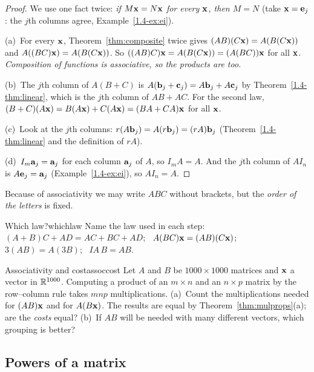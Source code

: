 \documentclass[11pt]{article}
\begin{document}
\begin{proof}
We use one fact twice: \emph{if $M\mathbf{x}=N\mathbf{x}$ for every $\mathbf{x}$, then $M=N$} (take $\mathbf{x}=\mathbf{e}_j$: the $j$th columns agree, Example~\ref{1.4-ex:ei}).

(a)~For every $\mathbf{x}$, Theorem~\ref{thm:composite} twice gives $(AB)(C\mathbf{x})=A(B(C\mathbf{x}))$ and $A((BC)\mathbf{x})=A(B(C\mathbf{x}))$. So $((AB)C)\mathbf{x}=A(B(C\mathbf{x}))=(A(BC))\mathbf{x}$ for all $\mathbf{x}$. \emph{Composition of functions is associative, so the products are too.}

(b)~The $j$th column of $A(B+C)$ is $A(\mathbf{b}_j+\mathbf{c}_j)=A\mathbf{b}_j+A\mathbf{c}_j$ by Theorem~\ref{1.4-thm:linear}, which is the $j$th column of $AB+AC$. For the second law, $(B+C)(A\mathbf{x})=B(A\mathbf{x})+C(A\mathbf{x})=(BA+CA)\mathbf{x}$ for all $\mathbf{x}$.

(c)~Look at the $j$th columns: $r(A\mathbf{b}_j)=A(r\mathbf{b}_j)=(rA)\mathbf{b}_j$ (Theorem~\ref{1.4-thm:linear} and the definition of $rA$).

(d)~$I_m\mathbf{a}_j=\mathbf{a}_j$ for each column $\mathbf{a}_j$ of $A$, so $I_mA=A$. And the $j$th column of $AI_n$ is $A\mathbf{e}_j=\mathbf{a}_j$ (Example~\ref{1.4-ex:ei}), so $AI_n=A$.
\end{proof}

Because of associativity we may write $ABC$ without brackets, but the \emph{order of the letters} is fixed.

\begin{kc}{Which law?}{whichlaw}
Name the law used in each step: $(A+B)C+AD=AC+BC+AD$; \ $A(BC)\mathbf{x}=(AB)(C\mathbf{x})$; \ $3(AB)=A(3B)$; \ $IA\,B=AB$.
\end{kc}

\begin{think}{Associativity and cost}{assoccost}
Let $A$ and $B$ be $1000\times1000$ matrices and $\mathbf{x}$ a vector in $\mathbb{R}^{1000}$. Computing a product of an $m\times n$ and an $n\times p$ matrix by the row--column rule takes $mnp$ multiplications. (a)~Count the multiplications needed for $(AB)\mathbf{x}$ and for $A(B\mathbf{x})$. The results are equal by Theorem~\ref{thm:mulprops}(a); are the \emph{costs} equal? (b)~If $AB$ will be needed with many different vectors, which grouping is better?
\end{think}

\subsection*{Powers of a matrix}
\end{document}
